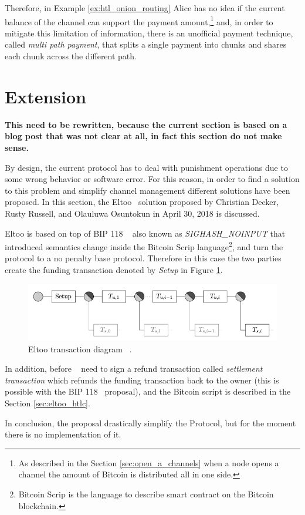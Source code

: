 Therefore, in Example \ref{ex:htl_onion_routing} Alice has no idea if the current balance of the channel can support the payment amount,\footnote{As described in the Section \ref{sec:open_a_channels} when a node opens a channel the amount of Bitcoin is distributed all in one side.} and, in order to mitigate this limitation of information, there is an unofficial payment technique, called \emph{multi path payment}, that splits a single payment into chunks and shares each chunk across the different path.

\section{{\LN} Extension}
\label{sec:eltoo}

{\bf This need to be rewritten, because the current section is based on a blog post that was not clear at all, in fact this section do not make sense.}

By design, the current {\LN} protocol has to deal with punishment operations due to some wrong behavior or software error. For this reason, in order
to find a solution to this problem and simplify channel management different solutions have been proposed.
In this section, the Eltoo~\cite{eltoo} solution proposed by Christian Decker, Rusty Russell, and Olauluwa Osuntokun in April 30, 2018 is discussed.

Eltoo is based on top of BIP 118 ~\cite{bip118} also known as \emph{SIGHASH\_NOINPUT} that introduced semantics change inside the Bitcoin Scrip language\footnote{Bitcoin Scrip is the language to describe smart contract on the Bitcoin blockchain.}, and turn the {\LN} protocol to a no penalty base protocol.
Therefore in this case the two parties create the funding transaction denoted by \emph{Setup} in Figure \ref{fig:eltoo_diagram_tx}.

\begin{figure}[h]
  \begin{center}
    \includegraphics[width=0.6\columnwidth]{imgs/1_USwvkUzr2-EHHkImnYz6gw.png}
  \end{center}
  \caption{Eltoo transaction diagram ~\cite{eltoo}.}
  \label{fig:eltoo_diagram_tx}
\end{figure}


In addition, before ~\cite{Palazzo_Estrazione_di_Informazioni_2019} need to sign a refund transaction called \emph{settlement transaction} which refunds the funding transaction back to the owner (this is possible with the BIP 118~\cite{bip118} proposal), and the Bitcoin script is described in the Section \ref{sec:eltoo_htlc}.

In conclusion, the proposal drastically simplify the {\LN} Protocol, but for the moment there is no implementation of it.
